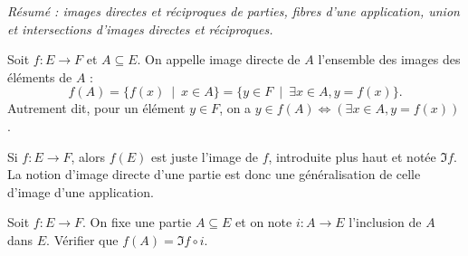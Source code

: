 \emph{Résumé : images directes et réciproques de parties, fibres d'une application, union et intersections d'images directes et réciproques.}


\begin{definition}
Soit $f : E\to F$ et $A\subseteq E$. On appelle image directe de $A$ l'ensemble des images des éléments de $A$ :
\[f(A) = \{f(x)\:\mid\: x\in A\} = \{y\in F \:\mid\: \exists x\in A, y=f(x)\}.\]
Autrement dit, pour un élément $y\in F$, on a $y\in f(A) \iff \left(\exists x\in A, y=f(x)\right)$.
\end{definition}

\begin{exemple}
Si $f : E\to F$, alors $f(E)$ est juste l'image de $f$, introduite plus haut et notée $\Im f$. La notion d'image directe d'une partie est donc une généralisation de celle d'image d'une application.
\end{exemple}

\begin{exercice}
Soit $f : E\to F$. On fixe une partie $A\subseteq E$ et on note $i : A\to E$ l'inclusion de $A$ dans $E$. Vérifier que $f(A) = \Im f\circ i$.
\end{exercice}


